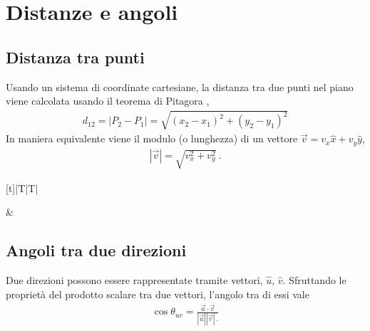 \documentclass[letterpaper,10pt,italian]{jupyterBook}
\begin{document}
\sphinxstepscope


\section{Distanze e angoli}
\label{\detokenize{ch/analytic_geometry/analytic_geometry_2d/points:distanze-e-angoli}}\label{\detokenize{ch/analytic_geometry/analytic_geometry_2d/points:geometry-analytic-2d-points}}\label{\detokenize{ch/analytic_geometry/analytic_geometry_2d/points::doc}}

\subsection{Distanza tra punti}
\label{\detokenize{ch/analytic_geometry/analytic_geometry_2d/points:distanza-tra-punti}}\label{\detokenize{ch/analytic_geometry/analytic_geometry_2d/points:geometry-analytic-2d-points-point-point-distance}}
\sphinxAtStartPar
Usando un sistema di coordinate cartesiane, la distanza tra due punti nel piano viene calcolata usando il teorema di Pitagora ,
\begin{equation*}
\begin{split}d_{12} = |P_2 - P_1| = \sqrt{(x_2 - x_1)^2 + (y_2 - y_1)^2}\end{split}
\end{equation*}
\sphinxAtStartPar
In maniera equivalente viene il modulo (o lunghezza) di un vettore \(\vec{v} = v_x \hat{x} + v_y \hat{y}\),
\begin{equation*}
\begin{split}|\vec{v}| = \sqrt{v_x^2 + v_y^2} \ .\end{split}
\end{equation*}

\begin{savenotes}\sphinxattablestart
\centering
\begin{tabulary}{\linewidth}[t]{|T|T|}
\hline

\sphinxAtStartPar
{}
&
\sphinxAtStartPar
{}
\\
\hline
\end{tabulary}
\par
\sphinxattableend\end{savenotes}


\subsection{Angoli tra due direzioni}
\label{\detokenize{ch/analytic_geometry/analytic_geometry_2d/points:angoli-tra-due-direzioni}}\label{\detokenize{ch/analytic_geometry/analytic_geometry_2d/points:geometry-analytic-2d-points-angles}}
\sphinxAtStartPar
Due direzioni possono essere rappresentate tramite vettori, \(\hat{u}\), \(\hat{v}\). Sfruttando le proprietà del prodotto scalare tra due vettori, l’angolo tra di essi vale
\begin{equation*}
\begin{split}\cos \theta_{uv} = \frac{\vec{u} \cdot \vec{v}}{|\vec{u}| |\vec{v}| \ .}\end{split}
\end{equation*}
\end{document}
